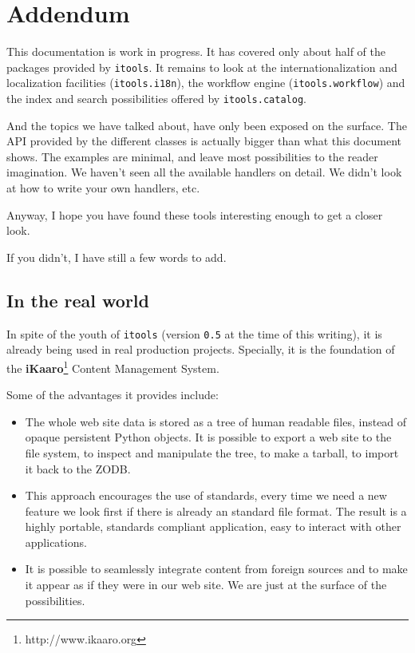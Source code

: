 \chapter{Addendum}

This documentation is work in progress. It has covered only about half of
the packages provided by {\tt itools}. It remains to look at the
internationalization and localization facilities ({\tt itools.i18n}), the
workflow engine ({\tt itools.workflow}) and the index and search
possibilities offered by {\tt itools.catalog}.

And the topics we have talked about, have only been exposed on the surface.
The API provided by the different classes is actually bigger than what this
document shows. The examples are minimal, and leave most possibilities to
the reader imagination. We haven't seen all the available handlers on detail.
We didn't look at how to write your own handlers, etc.

Anyway, I hope you have found these tools interesting enough to get a closer
look.

If you didn't, I have still a few words to add.


\section{In the real world}

In spite of the youth of {\tt itools} (version {\tt 0.5} at the time of this
writing), it is already being used in real production projects. Specially,
it is the foundation of the {\bf iKaaro}\footnote{http://www.ikaaro.org}
Content Management System.

Some of the advantages it provides include:

\begin{itemize}
  \item The whole web site data is stored as a tree of human readable
    files, instead of opaque persistent Python objects. It is possible
    to export a web site to the file system, to inspect and manipulate
    the tree, to make a tarball, to import it back to the ZODB.

  \item This approach encourages the use of standards, every time we
    need a new feature we look first if there is already an standard
    file format. The result is a highly portable, standards compliant
    application, easy to interact with other applications.

  \item It is possible to seamlessly integrate content from foreign
    sources and to make it appear as if they were in our web site.
    We are just at the surface of the possibilities.
\end{itemize}

